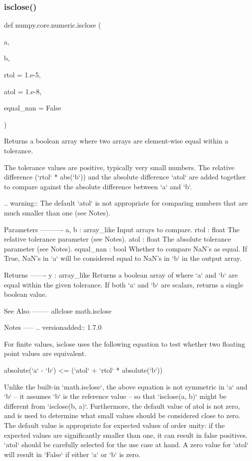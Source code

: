 \subsubsection{\texorpdfstring{isclose()}{isclose()}}
{\footnotesize\ttfamily def numpy.\+core.\+numeric.\+isclose (\begin{DoxyParamCaption}\item[{}]{a,  }\item[{}]{b,  }\item[{}]{rtol = {\ttfamily 1.e-\/5},  }\item[{}]{atol = {\ttfamily 1.e-\/8},  }\item[{}]{equal\+\_\+nan = {\ttfamily False} }\end{DoxyParamCaption})}

\begin{DoxyVerb}Returns a boolean array where two arrays are element-wise equal within a
tolerance.

The tolerance values are positive, typically very small numbers.  The
relative difference (`rtol` * abs(`b`)) and the absolute difference
`atol` are added together to compare against the absolute difference
between `a` and `b`.

.. warning:: The default `atol` is not appropriate for comparing numbers
             that are much smaller than one (see Notes).

Parameters
----------
a, b : array_like
    Input arrays to compare.
rtol : float
    The relative tolerance parameter (see Notes).
atol : float
    The absolute tolerance parameter (see Notes).
equal_nan : bool
    Whether to compare NaN's as equal.  If True, NaN's in `a` will be
    considered equal to NaN's in `b` in the output array.

Returns
-------
y : array_like
    Returns a boolean array of where `a` and `b` are equal within the
    given tolerance. If both `a` and `b` are scalars, returns a single
    boolean value.

See Also
--------
allclose
math.isclose

Notes
-----
.. versionadded:: 1.7.0

For finite values, isclose uses the following equation to test whether
two floating point values are equivalent.

 absolute(`a` - `b`) <= (`atol` + `rtol` * absolute(`b`))

Unlike the built-in `math.isclose`, the above equation is not symmetric
in `a` and `b` -- it assumes `b` is the reference value -- so that
`isclose(a, b)` might be different from `isclose(b, a)`. Furthermore,
the default value of atol is not zero, and is used to determine what
small values should be considered close to zero. The default value is
appropriate for expected values of order unity: if the expected values
are significantly smaller than one, it can result in false positives.
`atol` should be carefully selected for the use case at hand. A zero value
for `atol` will result in `False` if either `a` or `b` is zero.


\end{DoxyVerb}
